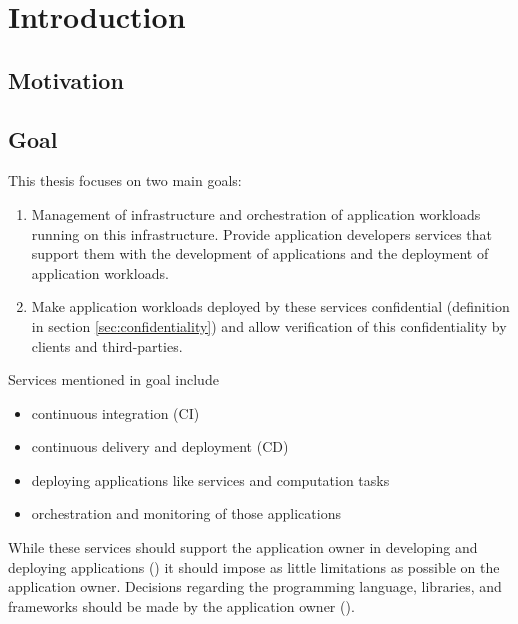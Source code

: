 
\chapter{Introduction}
\label{ch:Introduction}

\section{Motivation}
\label{sec:motivation}

\section{Goal}
\label{sec:goal}

This thesis focuses on two main goals:

\begin{enumerate}[label=\textbf{\Roman*}]
  \item Management of infrastructure and orchestration of application workloads
  running on this infrastructure. Provide application developers services that
  support them with the development of applications and the deployment of
  application workloads.
  \item Make application workloads deployed by these services confidential
  (definition in section \ref{sec:confidentiality}) and allow verification of
  this confidentiality by clients and third-parties.
\end{enumerate}

Services mentioned in goal  include
\begin{itemize}
  \item continuous integration (CI)
  \item continuous delivery and deployment (CD)
  \item deploying applications like services and computation tasks
  \item orchestration and monitoring of those applications
\end{itemize}
While these services should support the application owner in developing and
deploying applications () it should impose as little
limitations as possible on the application owner. Decisions regarding the
programming language, libraries, and frameworks should be made by the
application owner ().

